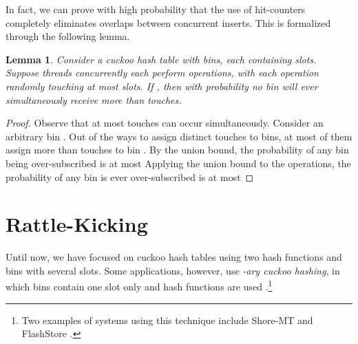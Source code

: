 \documentclass{sig-alternate-05-2015}
\newtheorem{lem}[thm]{Lemma}
\begin{document}
In fact, we can prove with high probability that the use of
hit-counters completely eliminates overlaps between concurrent
inserts. This is formalized through the following
lemma.

\begin{lem}\label{lemhighprob}
  Consider a cuckoo hash table with  bins, each containing 
  slots. Suppose  threads concurrently each perform  operations,
  with each operation randomly touching at most  slots. If , then with probability  no bin will
  ever simultaneously receive more than  touches.
\end{lem}
\begin{proof}
  Observe that at most  touches can occur
  simultaneously. Consider an arbitrary bin . Out of the  ways to assign  distinct touches to  bins, at
  most  of
  them assign more than  touches to bin . By the union bound,
  the probability of any bin being over-subscribed is at most
   Applying the union bound to
  the  operations, the probability of any bin is ever
  over-subscribed is at most
  
\end{proof}







































\section{Rattle-Kicking} \label{sec_dary_walk} 

Until now, we have focused on cuckoo hash tables using two hash
functions and bins with several slots. Some applications, however, use
\emph{-ary cuckoo hashing}, in which bins contain one slot only and
 hash functions are used \cite{dary}.\footnote{Two examples of
  systems using this technique include Shore-MT \cite{flash10} and
  FlashStore \cite{johnson09}.}
\end{document}
